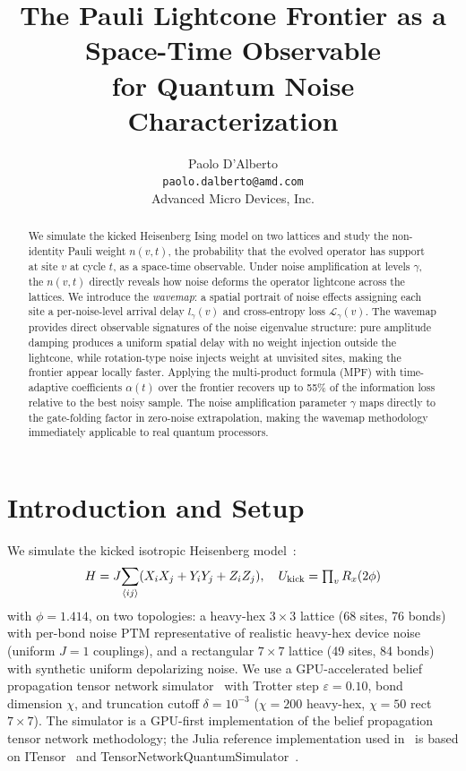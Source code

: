 \documentclass[letterpaper]{article}
\title{The Pauli Lightcone Frontier as a Space-Time Observable\\
       for Quantum Noise Characterization}
\author{Paolo D'Alberto\\
  \texttt{paolo.dalberto@amd.com}\\
  Advanced Micro Devices, Inc.
}
\begin{document}
\maketitle

\begin{abstract}
We simulate the kicked Heisenberg Ising model on two lattices and
study the non-identity Pauli weight $n(v,t)$, the probability that the
evolved operator has support at site $v$ at cycle $t$, as a space-time
observable.  Under noise amplification at levels $\gamma$, the
$n(v,t)$ directly reveals how noise deforms the operator lightcone
across the lattices.  We introduce the \emph{wavemap}: a spatial
portrait of noise effects assigning each site a per-noise-level
arrival delay $l_\gamma(v)$ and cross-entropy loss
$\mathcal{L}_\gamma(v)$.  The wavemap provides direct observable
signatures of the noise eigenvalue structure: pure amplitude damping
produces a uniform spatial delay with no weight injection outside the
lightcone, while rotation-type noise injects weight at unvisited
sites, making the frontier appear locally faster.  Applying
the multi-product formula (MPF) with time-adaptive coefficients
$\alpha(t)$ over the frontier recovers up to 55\% of the information
loss relative to the best noisy sample.  The noise amplification
parameter $\gamma$ maps directly to the gate-folding factor in
zero-noise extrapolation, making the wavemap methodology immediately
applicable to real quantum processors.
\end{abstract}

\section{Introduction and Setup}
\label{sec:intro}

We simulate the kicked isotropic Heisenberg model~\cite{Begusic2025RealTime}:
\begin{equation}
H = J\!\sum_{\langle ij\rangle}(X_iX_j+Y_iY_j+Z_iZ_j),\quad
U_{\rm kick}=\textstyle\prod_v R_x(2\phi)
\end{equation}
with $\phi=1.414$,
on two topologies: a heavy-hex $3\times3$ lattice (68 sites,
76 bonds) with per-bond noise PTM representative of realistic
heavy-hex device noise (uniform $J=1$ couplings),
and a rectangular $7\times7$ lattice (49 sites, 84 bonds) with synthetic
uniform depolarizing noise.
We use a GPU-accelerated belief propagation tensor network simulator~\cite{dalberto2026ising}
with Trotter step $\varepsilon=0.10$, bond dimension $\chi$, and
truncation cutoff $\delta=10^{-3}$ ($\chi=200$ heavy-hex, $\chi=50$
rect $7\times7$). The simulator is a GPU-first implementation of the
belief propagation tensor network methodology; the Julia reference
implementation used in~\cite{robertson2026lindbladmultiproductformulas}
is based on ITensor~\cite{ITensor} and
TensorNetworkQuantumSimulator~\cite{tindall2023gauging_bp,rudolph2025simulating2d}.
\end{document}
